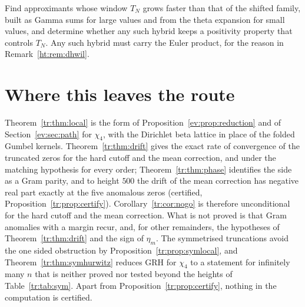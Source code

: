 \begin{problem}\label{ht:prob:hybrid}
Find approximants whose window $T_N$ grows faster than that of the shifted family, built as Gamma sums for large values and from the theta expansion for small values, and determine whether any such hybrid keeps a positivity property that controls $T_N$. Any such hybrid must carry the Euler product, for the reason in Remark~\ref{ht:rem:dhwil}.
\end{problem}

\section{Where this leaves the route}\label{tr:sec:path}

Theorem~\ref{tr:thm:local} is the form of Proposition~\ref{ev:prop:reduction} and of Section~\ref{ev:sec:path} for $\chi_4$, with the Dirichlet beta lattice in place of the folded Gumbel kernels. Theorem~\ref{tr:thm:drift} gives the exact rate of convergence of the truncated zeros for the hard cutoff and the mean correction, and under the matching hypothesis for every order; Theorem~\ref{tr:thm:phase} identifies the side as a Gram parity, and to height $500$ the drift of the mean correction has negative real part exactly at the five anomalous zeros (certified, Proposition~\ref{tr:prop:certify}). Corollary~\ref{tr:cor:nogo} is therefore unconditional for the hard cutoff and the mean correction. What is not proved is that Gram anomalies with a margin recur, and, for other remainders, the hypotheses of Theorem~\ref{tr:thm:drift} and the sign of $\eta_m$. The symmetrised truncations avoid the one sided obstruction by Proposition~\ref{tr:prop:symlocal}, and Theorem~\ref{tr:thm:symhurwitz} reduces GRH for $\chi_4$ to a statement for infinitely many $n$ that is neither proved nor tested beyond the heights of Table~\ref{tr:tab:sym}. Apart from Proposition~\ref{tr:prop:certify}, nothing in the computation is certified.
